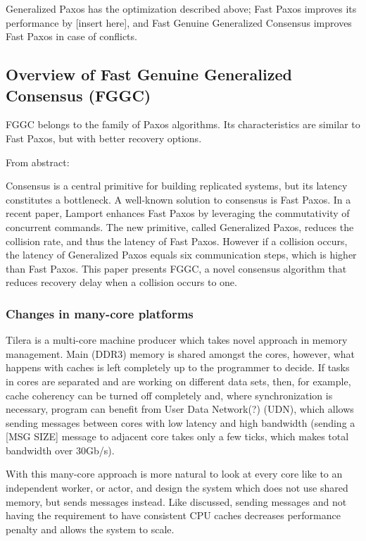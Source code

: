 \documentclass[english,11pt]{article}
\begin{document}
Generalized Paxos has the optimization described above; Fast Paxos improves its
performance by [insert here], and Fast Genuine Generalized Consensus improves
Fast Paxos in case of conflicts.

\subsection{Overview of Fast Genuine Generalized Consensus (FGGC)}

FGGC belongs to the family of Paxos algorithms. Its characteristics are similar
to Fast Paxos, but with better recovery options.

From abstract\cite{fggc}:

Consensus is a central primitive for building replicated systems, but its
latency constitutes a bottleneck. A well-known solution to consensus is Fast
Paxos. In a recent paper, Lamport enhances Fast Paxos by leveraging the
commutativity of concurrent commands. The new primitive, called Generalized
Paxos, reduces the collision rate, and thus the latency of Fast Paxos. However
if a collision occurs, the latency of Generalized Paxos equals six
communication steps, which is higher than Fast Paxos. This paper presents FGGC,
a novel consensus algorithm that reduces recovery delay when a collision occurs
to one.

\subsubsection{Changes in many-core platforms}
\label{sec:many-core}

Tilera is a multi-core machine producer which takes novel approach in memory
management. Main (DDR3) memory is shared amongst the cores, however, what
happens with caches is left completely up to the programmer to decide. If tasks
in cores are separated and are working on different data sets, then, for
example, cache coherency can be turned off completely and, where synchronization
is necessary, program can benefit from User Data Network(?) (UDN), which allows
sending messages between cores with low latency and high bandwidth (sending a
[MSG SIZE] message to adjacent core takes only a few ticks, which makes total
bandwidth over 30Gb/s).

With this many-core approach is more natural to look at every core like to an
independent worker, or actor, and design the system which does not use shared
memory, but sends messages instead. Like discussed, sending messages and not
having the requirement to have consistent CPU caches decreases performance
penalty and allows the system to scale.
\end{document}
